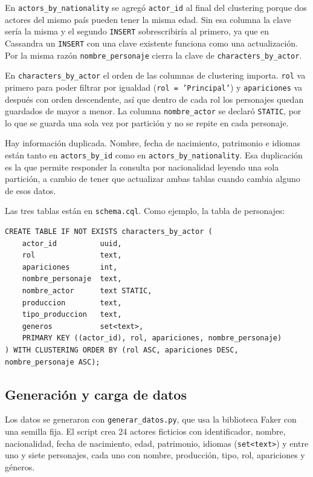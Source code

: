 \documentclass[11pt,a4paper]{article}
\begin{document}
En \texttt{actors\_by\_nationality} se agregó \texttt{actor\_id} al final del clustering
porque dos actores del mismo país pueden tener la misma edad. Sin esa columna la clave sería
la misma y el segundo \texttt{INSERT} sobrescribiría al primero, ya que en Cassandra un
\texttt{INSERT} con una clave existente funciona como una actualización. Por la misma razón
\texttt{nombre\_personaje} cierra la clave de \texttt{characters\_by\_actor}.

En \texttt{characters\_by\_actor} el orden de las columnas de clustering importa. \texttt{rol}
va primero para poder filtrar por igualdad (\texttt{rol = 'Principal'}) y \texttt{apariciones}
va después con orden descendente, así que dentro de cada rol los personajes quedan guardados
de mayor a menor. La columna \texttt{nombre\_actor} se declaró \texttt{STATIC}, por lo que se
guarda una sola vez por partición y no se repite en cada personaje.

Hay información duplicada. Nombre, fecha de nacimiento, patrimonio e idiomas están tanto en
\texttt{actors\_by\_id} como en \texttt{actors\_by\_nationality}. Esa duplicación es la que
permite responder la consulta por nacionalidad leyendo una sola partición, a cambio de tener
que actualizar ambas tablas cuando cambia alguno de esos datos.

Las tres tablas están en \texttt{schema.cql}. Como ejemplo, la tabla de personajes:

\begin{lstlisting}
CREATE TABLE IF NOT EXISTS characters_by_actor (
    actor_id          uuid,
    rol               text,
    apariciones       int,
    nombre_personaje  text,
    nombre_actor      text STATIC,
    produccion        text,
    tipo_produccion   text,
    generos           set<text>,
    PRIMARY KEY ((actor_id), rol, apariciones, nombre_personaje)
) WITH CLUSTERING ORDER BY (rol ASC, apariciones DESC, nombre_personaje ASC);
\end{lstlisting}

\subsection{Generación y carga de datos}

Los datos se generaron con \texttt{generar\_datos.py}, que usa la biblioteca Faker con una
semilla fija. El script crea 24 actores ficticios con identificador, nombre, nacionalidad,
fecha de nacimiento, edad, patrimonio, idiomas (\texttt{set<text>}) y entre uno y siete
personajes, cada uno con nombre, producción, tipo, rol, apariciones y géneros.
\end{document}
